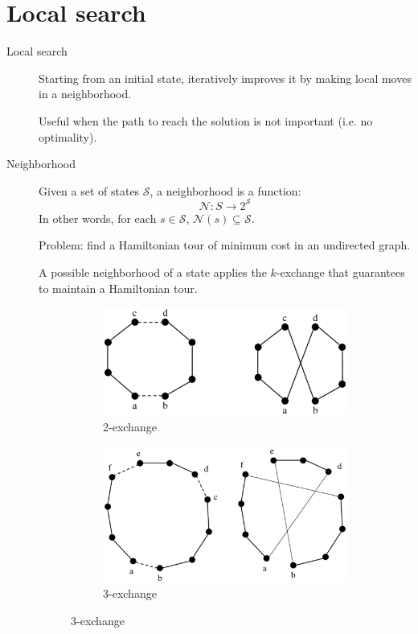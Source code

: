 \chapter{Local search}

\begin{description}
    \item[Local search] 
        Starting from an initial state, iteratively improves it by making local moves in a neighborhood.

        Useful when the path to reach the solution is not important (i.e. no optimality).

    \item[Neighborhood] 
        Given a set of states $\mathcal{S}$, a neighborhood is a function:
        \[ \mathcal{N}: S \rightarrow 2^\mathcal{S} \]
        In other words, for each $s \in \mathcal{S}$, $\mathcal{N}(s) \subseteq \mathcal{S}$.

        \begin{example}
            Problem: find a Hamiltonian tour of minimum cost in an undirected graph.
            
            A possible neighborhood of a state applies the $k$-exchange that guarantees to maintain a Hamiltonian tour.
            \begin{figure}[H]
                \begin{subfigure}{.5\textwidth}
                    \centering
                    \includegraphics[width=.70\linewidth]{img/tsp_2-exchange.png}
                    \caption{2-exchange}
                \end{subfigure}%
                \begin{subfigure}{.5\textwidth}
                    \centering
                    \includegraphics[width=.70\linewidth]{img/tsp_3-exchange.png}
                    \caption{3-exchange}
                \end{subfigure}
            \end{figure}
        \end{example}


\end{description}
